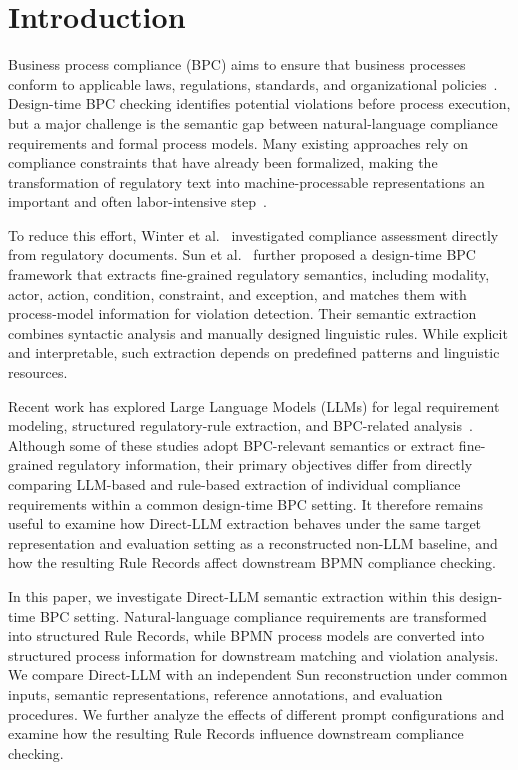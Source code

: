 \documentclass[conference]{IEEEtran}
\begin{document}
\section{Introduction}
\label{sec:1}

Business process compliance (BPC) aims to ensure that business processes conform to applicable laws, regulations, standards, and organizational policies~\cite{hashmi2018we}. Design-time BPC checking identifies potential violations before process execution, but a major challenge is the semantic gap between natural-language compliance requirements and formal process models. Many existing approaches rely on compliance constraints that have already been formalized, making the transformation of regulatory text into machine-processable representations an important and often labor-intensive step~\cite{hashmi2018we,zasada2023evaluation}.

To reduce this effort, Winter et al.~\cite{winter2020assessing} investigated compliance assessment directly from regulatory documents. Sun et al.~\cite{sun2024design} further proposed a design-time BPC framework that extracts fine-grained regulatory semantics, including modality, actor, action, condition, constraint, and exception, and matches them with process-model information for violation detection. Their semantic extraction combines syntactic analysis and manually designed linguistic rules. While explicit and interpretable, such extraction depends on predefined patterns and linguistic resources.

Recent work has explored Large Language Models (LLMs) for legal requirement modeling, structured regulatory-rule extraction, and BPC-related analysis~\cite{de2024towards,barrientos2026impact,barrientos2026taming,guliani2026dejure}. Although some of these studies adopt BPC-relevant semantics or extract fine-grained regulatory information, their primary objectives differ from directly comparing LLM-based and rule-based extraction of individual compliance requirements within a common design-time BPC setting. It therefore remains useful to examine how Direct-LLM extraction behaves under the same target representation and evaluation setting as a reconstructed non-LLM baseline, and how the resulting Rule Records affect downstream BPMN compliance checking.

In this paper, we investigate Direct-LLM semantic extraction within this design-time BPC setting. Natural-language compliance requirements are transformed into structured Rule Records, while BPMN process models are converted into structured process information for downstream matching and violation analysis. We compare Direct-LLM with an independent Sun reconstruction under common inputs, semantic representations, reference annotations, and evaluation procedures. We further analyze the effects of different prompt configurations and examine how the resulting Rule Records influence downstream compliance checking.
\end{document}
